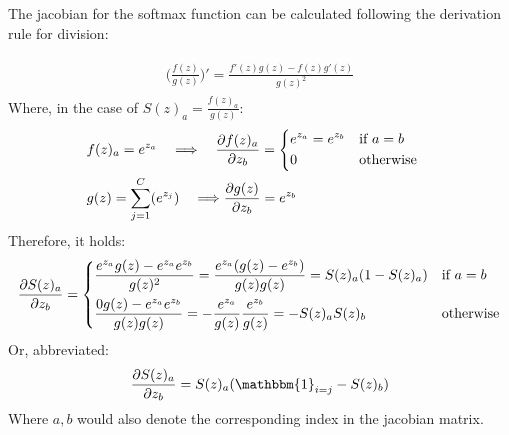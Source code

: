 \begin{tcolorbox}

  The jacobian for the softmax function can be calculated following the derivation rule for division:

  \begin{align*}
    \begin{aligned}
      \Big( \frac{f(z)}{g(z)}\Big)' = \frac{f'(z)g(z) - f(z)g'(z)}{g(z)^2}
    \end{aligned}
  \end{align*}
  Where, in the case of \(S(z)_a = \frac{f(z)_a}{g(z)}\):
  \begin{align*}
    \begin{aligned}
      & f(z)_a = e^{z_a} \quad \Longrightarrow \quad \frac{\partial f(z)_a}{\partial z_b}
      = \begin{dcases}
        e^{z_a} = e^{z_b} & \text{if } a=b\\
        0     & \text{otherwise}
      \end{dcases}\\
      & g(z) = \sum_{j=1}^C(e^{z_j}) \quad \Longrightarrow \frac{\partial g(z)}{\partial z_b} = e^{z_b}\\
    \end{aligned}
  \end{align*}
  Therefore, it holds:
  \begin{align*}
    \begin{aligned}
      \frac{\partial S(z)_a}{\partial z_b} = \begin{dcases}
        \frac{e^{z_a}g(z)-e^{z_a}e^{z_b}}{g(z)^2} = \frac{e^{z_a}(g(z)-e^{z_b})}{g(z)g(z)}  = S(z)_a(1-S(z)_a)       & \text{if } a=b\\
        \frac{0g(z)-e^{z_a}e^{z_b}}{g(z)g(z)} = -\frac{e^{z_a}}{g(z)}\frac{e^{z_b}}{g(z)} = -S(z)_a S(z)_b
        & \text{otherwise}
      \end{dcases}\\
    \end{aligned}
  \end{align*}   %
  Or, abbreviated:
  \begin{align*}
    \begin{aligned}
      \frac{\partial S(z)_a}{\partial z_b} = S(z)_a(\mathbbm{1}_{i=j}-S(z)_b)
    \end{aligned}
  \end{align*}   %
  Where \(a,b\) would also denote the corresponding index in the jacobian matrix.
\end{tcolorbox}


